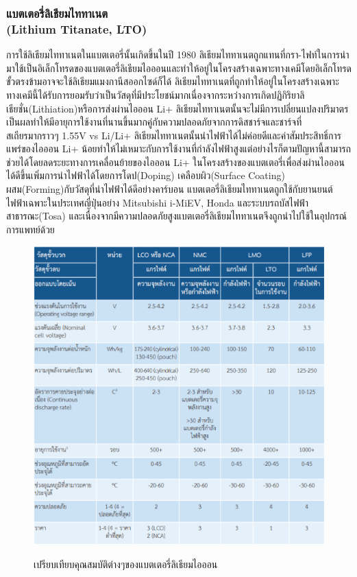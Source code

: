 \subsubsection*{แบตเตอรี่ลิเธียมไททาเนต\\ (Lithium Titanate, LTO)}
	การใช้ลิเธียมไททาเนตในแบตเตอรี่นั้นเกิดขึ้นในปี 1980 ลิเธียมไททาเนตถูกแทนที่กรา-ไฟท์ในการนำมาใช้เป็นอิเล็กโทรดของแบตเตอรี่ลิเธียมไอออนและทำให้อยู่ในโครงสร้างเฉพาะทางเคมีโดยอิเล็กโทรดขั้วตรงข้ามอาจจะใช้ลิเธียมแมงกานีสออกไซด์ก็ได้ ลิเธียมไททาเนตที่ถูกทำให้อยู่ในโครงสร้างเฉพาะทางเคมีนี้ได้รับการยอมรับว่าเป็นวัสดุที่มีประโยชน์มากเนื่องจากระหว่างการเกิดปฏิกิริยาลิเธียชั่น(Lithiation)หรือการส่งผ่านไอออน Li+ ลิเธียมไททาเนตนั้นจะไม่มีการเปลี่ยนแปลงปริมาตรเป็นผลทำให้มีอายุการใช้งานที่นานขึ้นมากคู่กับความปลอดภัยจากการดิสชาร์จและชาร์จที่\\สเถียรมากราวๆ 1.55V vs Li/Li+ ลิเธียมไททาเนตนั้นนำไฟฟ้าได้ไม่ค่อยดีและค่าสัมประสิทธิ์การแพร่ของไอออน Li+ น้อยทำให้ไม่เหมาะกับการใช้งานที่กำลังไฟฟ้าสูงแต่อย่างไรก็ตามปัญหานี้สามารถช่วยได้โดยลดระยะทางการเคลื่อนย้ายของไอออน Li+ ในโครงสร้างของแบตเตอรี่เพื่อส่งผ่านไอออนได้ดีขึ้นเพิ่มการนำไฟฟ้าได้โดยการโดป(Doping) เคลือบผิว(Surface Coating) ผสม(Forming)กับวัสดุที่นำไฟฟ้าได้ดีอย่างคาร์บอน
\newline\hspace*{2cm}
แบตเตอรี่ลิเธียมไททาเนตถูกใช้กับยานยนต์ไฟฟ้าเฉพาะในประเทศญี่ปุ่นอย่าง Mitsubishi i-MiEV, Honda และระบบรถบัสไฟฟ้าสาธารณะ(Tosa) และเนื่องจากมีความปลอดภัยสูงแบตเตอรี่ลิเธียมไททาเนตจึงถูกนำไปใช้ในอุปกรณ์การแพทย์ด้วย
\begin{center}
	\begin{figure}[H]
		\includegraphics[width=1\linewidth]{Chapters/img/Compare_Spec_Batteries.png}
			\centering
			\captionsetup{justification=centering,margin=2cm}
			\caption{เปรียบเทียบคุณสมบัติต่างๆของแบตเตอรี่ลิเธียมไอออน}
			\cite{TableBattery}
	\end{figure}
\end{center}
